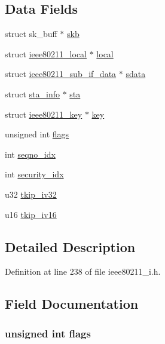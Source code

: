 \subsection*{Data Fields}
\begin{DoxyCompactItemize}
\item 
struct sk\-\_\-buff $\ast$ \hyperlink{structieee80211__rx__data_aeba6836824708325a83121030f092c30}{skb}
\item 
struct \hyperlink{structieee80211__local}{ieee80211\-\_\-local} $\ast$ \hyperlink{structieee80211__rx__data_ad436a024f420f219c4fe2eebce7e4ab2}{local}
\item 
struct \hyperlink{structieee80211__sub__if__data}{ieee80211\-\_\-sub\-\_\-if\-\_\-data} $\ast$ \hyperlink{structieee80211__rx__data_ad829d8d33f06a7245cc303f924f259ac}{sdata}
\item 
struct \hyperlink{structsta__info}{sta\-\_\-info} $\ast$ \hyperlink{structieee80211__rx__data_aafa9dadbeccd54b4a6b9f77f2908a093}{sta}
\item 
struct \hyperlink{structieee80211__key}{ieee80211\-\_\-key} $\ast$ \hyperlink{structieee80211__rx__data_a6fb9dce4966e6727c301a63b8185c388}{key}
\item 
unsigned int \hyperlink{structieee80211__rx__data_ac92588540e8c1d014a08cd8a45462b19}{flags}
\item 
int \hyperlink{structieee80211__rx__data_a5e3319f7a0db16f766c18522826f155e}{seqno\-\_\-idx}
\item 
int \hyperlink{structieee80211__rx__data_ae61977ea897e469c291f27e7e5b09d19}{security\-\_\-idx}
\item 
u32 \hyperlink{structieee80211__rx__data_a0f259da682b3ab5890f6e19716221029}{tkip\-\_\-iv32}
\item 
u16 \hyperlink{structieee80211__rx__data_a1b0e9025f6b0dc8ceb064641a7909a26}{tkip\-\_\-iv16}
\end{DoxyCompactItemize}


\subsection{Detailed Description}


Definition at line 238 of file ieee80211\-\_\-i.\-h.



\subsection{Field Documentation}
\hypertarget{structieee80211__rx__data_ac92588540e8c1d014a08cd8a45462b19}{
\subsubsection[{flags}]{\setlength{\rightskip}{0pt plus 5cm}unsigned int flags}}\label{structieee80211__rx__data_ac92588540e8c1d014a08cd8a45462b19}


